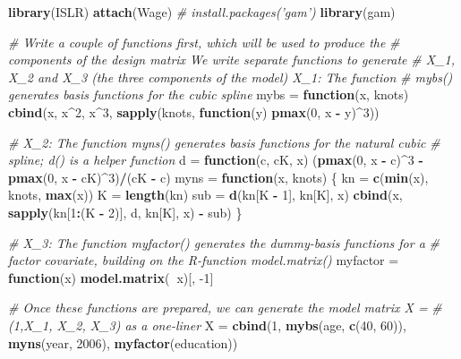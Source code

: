 \documentclass[]{article}
\newenvironment{Shaded}{\begin{snugshade}}{\end{snugshade}}
\newcommand{\KeywordTok}[1]{\textcolor[rgb]{0.13,0.29,0.53}{\textbf{#1}}}
\newcommand{\DecValTok}[1]{\textcolor[rgb]{0.00,0.00,0.81}{#1}}
\newcommand{\StringTok}[1]{\textcolor[rgb]{0.31,0.60,0.02}{#1}}
\newcommand{\CommentTok}[1]{\textcolor[rgb]{0.56,0.35,0.01}{\textit{#1}}}
\newcommand{\ControlFlowTok}[1]{\textcolor[rgb]{0.13,0.29,0.53}{\textbf{#1}}}
\newcommand{\OperatorTok}[1]{\textcolor[rgb]{0.81,0.36,0.00}{\textbf{#1}}}
\newcommand{\NormalTok}[1]{#1}
\begin{document}
\begin{Shaded}
\begin{Highlighting}[]
\KeywordTok{library}\NormalTok{(ISLR)}
\KeywordTok{attach}\NormalTok{(Wage)}
\CommentTok{# install.packages('gam')}
\KeywordTok{library}\NormalTok{(gam)}

\CommentTok{# Write a couple of functions first, which will be used to produce the}
\CommentTok{# components of the design matrix We write separate functions to generate}
\CommentTok{# X_1, X_2 and X_3 (the three components of the model) X_1: The function}
\CommentTok{# mybs() generates basis functions for the cubic spline}
\NormalTok{mybs =}\StringTok{ }\ControlFlowTok{function}\NormalTok{(x, knots) }\KeywordTok{cbind}\NormalTok{(x, x}\OperatorTok{^}\DecValTok{2}\NormalTok{, x}\OperatorTok{^}\DecValTok{3}\NormalTok{, }\KeywordTok{sapply}\NormalTok{(knots, }\ControlFlowTok{function}\NormalTok{(y) }\KeywordTok{pmax}\NormalTok{(}\DecValTok{0}\NormalTok{, }
\NormalTok{    x }\OperatorTok{-}\StringTok{ }\NormalTok{y)}\OperatorTok{^}\DecValTok{3}\NormalTok{))}

\CommentTok{# X_2: The function myns() generates basis functions for the natural cubic}
\CommentTok{# spline; d() is a helper function}
\NormalTok{d =}\StringTok{ }\ControlFlowTok{function}\NormalTok{(c, cK, x) (}\KeywordTok{pmax}\NormalTok{(}\DecValTok{0}\NormalTok{, x }\OperatorTok{-}\StringTok{ }\NormalTok{c)}\OperatorTok{^}\DecValTok{3} \OperatorTok{-}\StringTok{ }\KeywordTok{pmax}\NormalTok{(}\DecValTok{0}\NormalTok{, x }\OperatorTok{-}\StringTok{ }\NormalTok{cK)}\OperatorTok{^}\DecValTok{3}\NormalTok{)}\OperatorTok{/}\NormalTok{(cK }\OperatorTok{-}\StringTok{ }\NormalTok{c)}
\NormalTok{myns =}\StringTok{ }\ControlFlowTok{function}\NormalTok{(x, knots) \{}
\NormalTok{    kn =}\StringTok{ }\KeywordTok{c}\NormalTok{(}\KeywordTok{min}\NormalTok{(x), knots, }\KeywordTok{max}\NormalTok{(x))}
\NormalTok{    K =}\StringTok{ }\KeywordTok{length}\NormalTok{(kn)}
\NormalTok{    sub =}\StringTok{ }\KeywordTok{d}\NormalTok{(kn[K }\OperatorTok{-}\StringTok{ }\DecValTok{1}\NormalTok{], kn[K], x)}
    \KeywordTok{cbind}\NormalTok{(x, }\KeywordTok{sapply}\NormalTok{(kn[}\DecValTok{1}\OperatorTok{:}\NormalTok{(K }\OperatorTok{-}\StringTok{ }\DecValTok{2}\NormalTok{)], d, kn[K], x) }\OperatorTok{-}\StringTok{ }\NormalTok{sub)}
\NormalTok{\}}

\CommentTok{# X_3: The function myfactor() generates the dummy-basis functions for a}
\CommentTok{# factor covariate, building on the R-function model.matrix()}
\NormalTok{myfactor =}\StringTok{ }\ControlFlowTok{function}\NormalTok{(x) }\KeywordTok{model.matrix}\NormalTok{(}\OperatorTok{~}\NormalTok{x)[, }\DecValTok{-1}\NormalTok{]}

\CommentTok{# Once these functions are prepared, we can generate the model matrix X =}
\CommentTok{# (1,X_1, X_2, X_3) as a one-liner}
\NormalTok{X =}\StringTok{ }\KeywordTok{cbind}\NormalTok{(}\DecValTok{1}\NormalTok{, }\KeywordTok{mybs}\NormalTok{(age, }\KeywordTok{c}\NormalTok{(}\DecValTok{40}\NormalTok{, }\DecValTok{60}\NormalTok{)), }\KeywordTok{myns}\NormalTok{(year, }\DecValTok{2006}\NormalTok{), }\KeywordTok{myfactor}\NormalTok{(education))}
\end{Highlighting}
\end{Shaded}
\end{document}
